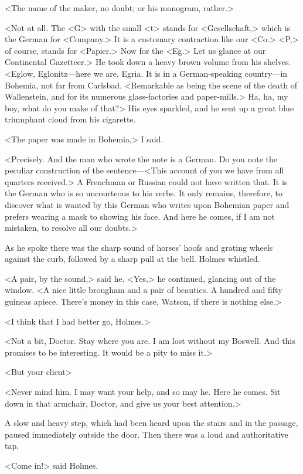 <The name of the maker, no doubt; or his monogram, rather.>

<Not at all. The <G> with the small <t> stands for <Gesellschaft,> which is the German for <Company.> It is a customary contraction like our <Co.> <P,> of course, stands for <Papier.> Now for the <Eg.> Let us glance at our Continental Gazetteer.> He took down a heavy brown volume from his shelves. <Eglow, Eglonitz—here we are, Egria. It is in a German-speaking country—in Bohemia, not far from Carlsbad. <Remarkable as being the scene of the death of Wallenstein, and for its numerous glass-factories and paper-mills.> Ha, ha, my boy, what do you make of that?> His eyes sparkled, and he sent up a great blue triumphant cloud from his cigarette.

<The paper was made in Bohemia,> I said.

<Precisely. And the man who wrote the note is a German. Do you note the peculiar construction of the sentence—<This account of you we have from all quarters received.> A Frenchman or Russian could not have written that. It is the German who is so uncourteous to his verbs. It only remains, therefore, to discover what is wanted by this German who writes upon Bohemian paper and prefers wearing a mask to showing his face. And here he comes, if I am not mistaken, to resolve all our doubts.>

As he spoke there was the sharp sound of horses' hoofs and grating wheels against the curb, followed by a sharp pull at the bell. Holmes whistled.

<A pair, by the sound,> said he. <Yes,> he continued, glancing out of the window. <A nice little brougham and a pair of beauties. A hundred and fifty guineas apiece. There's money in this case, Watson, if there is nothing else.>

<I think that I had better go, Holmes.>

<Not a bit, Doctor. Stay where you are. I am lost without my Boswell. And this promises to be interesting. It would be a pity to miss it.>

<But your client\longdash>

<Never mind him. I may want your help, and so may he. Here he comes. Sit down in that armchair, Doctor, and give us your best attention.>

A slow and heavy step, which had been heard upon the stairs and in the passage, paused immediately outside the door. Then there was a loud and authoritative tap.

<Come in!> said Holmes.

